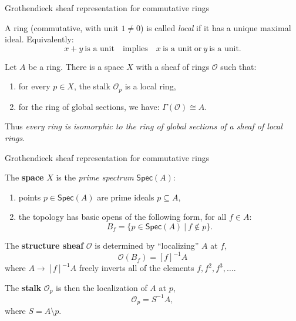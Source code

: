 \documentclass{beamer}
\newcommand{\myemph}[1]{\textbf{#1}}    %
\begin{document}
\begin{frame}{Grothendieck sheaf representation for commutative rings}

\begin{definition} A  ring (commutative, with unit $1\neq 0$) is called \emph{local} if it has a unique maximal ideal.
Equivalently: $$x+y\ \text{is a unit}\quad\text{implies}\quad x\ \text{is a unit}\ \text{or}\ y\ \text{is a unit}.$$
\end{definition}
%
\begin{theorem}[Grothendieck]
Let $A$ be a ring.  There is a space $X$ with a sheaf of rings $\mathcal{O}$ such that:
\begin{enumerate}
\item for every $p\in X$, the stalk $\mathcal{O}_p$ is a local ring, 
\item for the ring of global sections, we have: $\Gamma(\mathcal{O}) \cong A$.
\end{enumerate}
Thus \emph{every ring is isomorphic to the ring of global sections of a sheaf of local rings}.
\end{theorem}

\end{frame}
\begin{frame}{Grothendieck sheaf representation for commutative rings}

The \myemph{space} $X$ is the \emph{prime spectrum} $\mathsf{Spec}(A)$:
 \begin{enumerate}
\item points $p\in \mathsf{Spec}(A)$ are prime ideals $p\subseteq A$,
\item the topology has basic opens of the following form, for all $f\in A$:
 $$B_f = \{ p\in \mathsf{Spec}(A)\ |\ f\not\in p \}.$$
\end{enumerate}
The \myemph{structure sheaf} $\mathcal {O}$ is determined by ``localizing'' $A$ at $f$,
\[
\mathcal{O}(B_f) = [f]^{-1}A
\]
where $A \rightarrow [f]^{-1}A$ freely inverts all of the elements $f, f^2, f^3, \dots$.
\medskip

The \myemph{stalk} $\mathcal {O}_p$ is then the localization of $A$ at $p$,
\[
\mathcal{O}_p = S^{-1}A, 
\]
where $S = A\setminus p$.

\end{frame}
\end{document}
